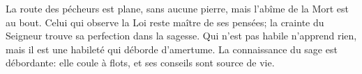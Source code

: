 La route des pécheurs est plane, sans aucune pierre,
	mais l’abîme de la Mort est au bout.
Celui qui observe la Loi reste maître de ses pensées;
	la crainte du Seigneur trouve sa perfection dans la sagesse.
Qui n’est pas habile n’apprend rien,
	mais il est une habileté qui déborde d’amertume.
La connaissance du sage est débordante:
	elle coule à flots, et ses conseils sont source de vie.
